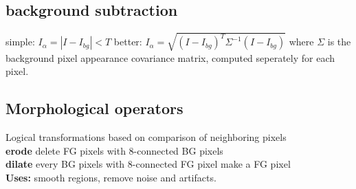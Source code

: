 \subsection*{background subtraction}
simple: $I_\alpha = |I - I_{bg}| < T$ better: $I_\alpha = \sqrt{(I - I_{bg})^T \Sigma^{-1} (I - I_{bg})}$ where $\Sigma$ is the background pixel appearance covariance matrix, computed seperately for each pixel.
\subsection*{Morphological operators}
Logical transformations based on comparison of neighboring pixels\\
\textbf{erode} delete FG pixels with 8-connected BG pixels\\
\textbf{dilate} every BG pixels with 8-connected FG pixel make a FG pixel\\
\textbf{Uses:} smooth regions, remove noise and artifacts.